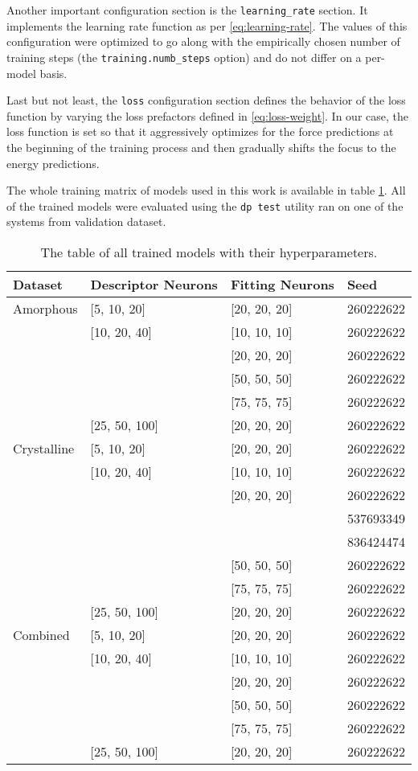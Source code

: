Another important configuration section is the \texttt{learning\_rate}
section. It implements the learning rate function as per
\eqref{eq:learning-rate}. The values of this configuration were optimized to
go along with the empirically chosen number of training steps
(the \texttt{training.numb\_steps} option) and do not differ on a per-model
basis.

Last but not least, the \texttt{loss} configuration section defines the
behavior of the loss function by varying the loss prefactors defined in
\eqref{eq:loss-weight}. In our case, the loss function is set so that it
aggressively optimizes for the force predictions at the beginning of the
training process and then gradually shifts the focus to the energy
predictions.

The whole training matrix of models used in this work is available in table
\ref{tab:models}. All of the trained models were evaluated using the
\texttt{dp test} utility ran on one of the systems from validation dataset.

\begin{table}
  \begin{tabularx}{\textwidth}{llll}
    \toprule
    Dataset & Descriptor Neurons & Fitting Neurons & Seed \\
    \midrule
    Amorphous & [5, 10, 20] & [20, 20, 20] & 260222622 \\
     & [10, 20, 40] & [10, 10, 10] & 260222622 \\
     & & [20, 20, 20] & 260222622 \\
     & & [50, 50, 50] & 260222622 \\
     & & [75, 75, 75] & 260222622 \\
     & [25, 50, 100] & [20, 20, 20] & 260222622 \\
    \midrule
    Crystalline & [5, 10, 20] & [20, 20, 20] & 260222622 \\
     & [10, 20, 40] & [10, 10, 10] & 260222622 \\
     & & [20, 20, 20] & 260222622 \\
     & & & 537693349 \\
     & & & 836424474 \\
     & & [50, 50, 50] & 260222622 \\
     & & [75, 75, 75] & 260222622 \\
     & [25, 50, 100] & [20, 20, 20] & 260222622 \\
    \bottomrule
    Combined & [5, 10, 20] & [20, 20, 20] & 260222622 \\
     & [10, 20, 40] & [10, 10, 10] & 260222622 \\
     & & [20, 20, 20] & 260222622 \\
     & & [50, 50, 50] & 260222622 \\
     & & [75, 75, 75] & 260222622 \\
     & [25, 50, 100] & [20, 20, 20] & 260222622 \\
  \end{tabularx}
  \caption{The table of all trained models with their hyperparameters.}
  \label{tab:models}
\end{table}

